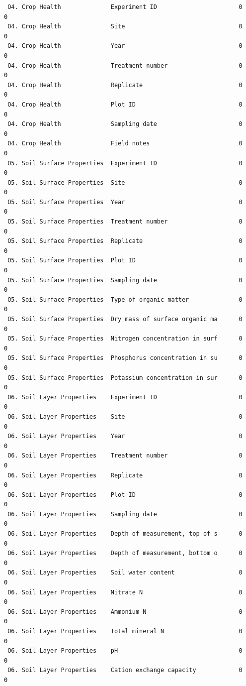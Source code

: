 \documentclass[
]{article}
\begin{document}
\begin{verbatim}
 O4. Crop Health              Experiment ID                       0       0
 O4. Crop Health              Site                                0       0
 O4. Crop Health              Year                                0       0
 O4. Crop Health              Treatment number                    0       0
 O4. Crop Health              Replicate                           0       0
 O4. Crop Health              Plot ID                             0       0
 O4. Crop Health              Sampling date                       0       0
 O4. Crop Health              Field notes                         0       0
 O5. Soil Surface Properties  Experiment ID                       0       0
 O5. Soil Surface Properties  Site                                0       0
 O5. Soil Surface Properties  Year                                0       0
 O5. Soil Surface Properties  Treatment number                    0       0
 O5. Soil Surface Properties  Replicate                           0       0
 O5. Soil Surface Properties  Plot ID                             0       0
 O5. Soil Surface Properties  Sampling date                       0       0
 O5. Soil Surface Properties  Type of organic matter              0       0
 O5. Soil Surface Properties  Dry mass of surface organic ma      0       0
 O5. Soil Surface Properties  Nitrogen concentration in surf      0       0
 O5. Soil Surface Properties  Phosphorus concentration in su      0       0
 O5. Soil Surface Properties  Potassium concentration in sur      0       0
 O6. Soil Layer Properties    Experiment ID                       0       0
 O6. Soil Layer Properties    Site                                0       0
 O6. Soil Layer Properties    Year                                0       0
 O6. Soil Layer Properties    Treatment number                    0       0
 O6. Soil Layer Properties    Replicate                           0       0
 O6. Soil Layer Properties    Plot ID                             0       0
 O6. Soil Layer Properties    Sampling date                       0       0
 O6. Soil Layer Properties    Depth of measurement, top of s      0       0
 O6. Soil Layer Properties    Depth of measurement, bottom o      0       0
 O6. Soil Layer Properties    Soil water content                  0       0
 O6. Soil Layer Properties    Nitrate N                           0       0
 O6. Soil Layer Properties    Ammonium N                          0       0
 O6. Soil Layer Properties    Total mineral N                     0       0
 O6. Soil Layer Properties    pH                                  0       0
 O6. Soil Layer Properties    Cation exchange capacity            0       0

\end{verbatim}
\end{document}
